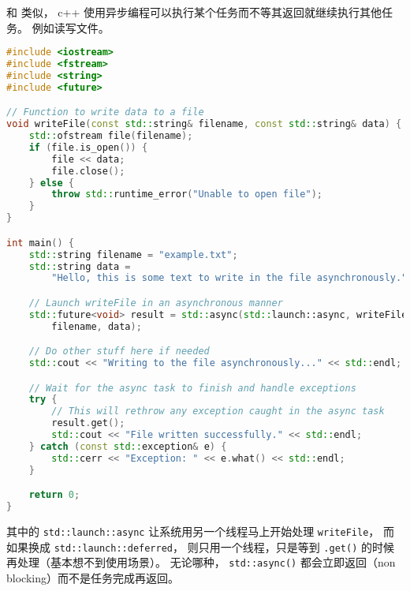 

\begin{issues}
\issueDraft
\end{issues}

和 类似， c++ 使用异步编程可以执行某个任务而不等其返回就继续执行其他任务。 例如读写文件。

\begin{lstlisting}[language=cpp]
#include <iostream>
#include <fstream>
#include <string>
#include <future>

// Function to write data to a file
void writeFile(const std::string& filename, const std::string& data) {
    std::ofstream file(filename);
    if (file.is_open()) {
        file << data;
        file.close();
    } else {
        throw std::runtime_error("Unable to open file");
    }
}

int main() {
    std::string filename = "example.txt";
    std::string data =
        "Hello, this is some text to write in the file asynchronously.";

    // Launch writeFile in an asynchronous manner
    std::future<void> result = std::async(std::launch::async, writeFile,
        filename, data);

    // Do other stuff here if needed
    std::cout << "Writing to the file asynchronously..." << std::endl;

    // Wait for the async task to finish and handle exceptions
    try {
        // This will rethrow any exception caught in the async task
        result.get();
        std::cout << "File written successfully." << std::endl;
    } catch (const std::exception& e) {
        std::cerr << "Exception: " << e.what() << std::endl;
    }

    return 0;
}
\end{lstlisting}
其中的 \verb`std::launch::async` 让系统用另一个线程马上开始处理 \verb`writeFile`， 而如果换成 \verb`std::launch::deferred`， 则只用一个线程，只是等到 \verb`.get()` 的时候再处理（基本想不到使用场景）。 无论哪种， \verb`std::async()` 都会立即返回（non blocking）而不是任务完成再返回。
